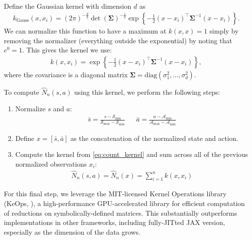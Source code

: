 
Define the Gaussian kernel with dimension $d$ as
\begin{align}
    k_\text{Gauss}(x, x_i) = (2 \pi) ^ {-\frac{d}{2}} \det(\bm{\Sigma})^{-\frac{1}{2}} \exp \left\{-\frac{1}{2} (x - x_i)^\intercal \bm{\Sigma}^{-1} (x - x_i) \right\}.
\end{align}
We can normalize this function to have a maximum at $k(x, x) = 1$ simply by removing the normalizer (everything outside the exponential) by noting that $e^0 = 1$.
This gives the kernel we use:
\begin{align} \label{eq:count_kernel}
    k(x, x_i) = \exp \left\{-\frac{1}{2} (x - x_i)^\intercal \bm{\Sigma}^{-1} (x - x_i) \right\},
\end{align}
where the covariance is a diagonal matrix $\bm{\Sigma} = \text{diag}(\sigma_1^2, \ldots, \sigma_d^2)$.

To compute $\hat N_n(s, a)$ using this kernel, we perform the following steps:
\begin{enumerate}
    \item Normalize $s$ and $a$:
    \begin{align}
        \bar{s} = \frac{s - \mathcal{S}_\text{min}}{\mathcal{S}_\text{max} - \mathcal{S}_\text{min}} && \bar{a} = \frac{a - \mathcal{A}_\text{min}}{\mathcal{A}_\text{max} - \mathcal{A}_\text{min}}
    \end{align}
    \item Define $x = [\bar{s}, \bar{a}]$ as the concatenation of the normalized state and action.
    \item Compute the kernel from \cref{eq:count_kernel} and sum across all of the previous normalized observations $x_i$:
    \begin{align}
        \hat N_n(s, a) = \hat N_n(x) = \sum_{i=1}^n k(x, x_i)
    \end{align}
\end{enumerate}

For this final step, we leverage the MIT-licensed Kernel Operations library (KeOps, \citet{keops}), a high-performance GPU-accelerated library for efficient computation of reductions on symbolically-defined matrices.
This substantially outperforms implementations in other frameworks, including fully-JITted JAX \citep{jax2018github} version, especially as the dimension of the data grows.

